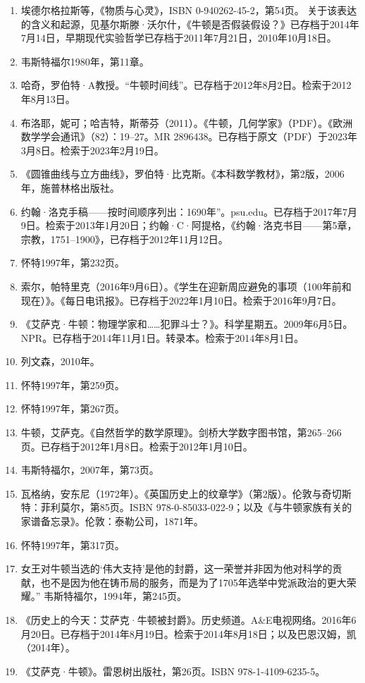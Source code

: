 \begin{enumerate}
\item 埃德尔格拉斯等，《物质与心灵》，ISBN 0-940262-45-2，第54页。  
关于该表达的含义和起源，见基尔斯滕·沃尔什，《牛顿是否假装假设？》已存档于2014年7月14日，早期现代实验哲学已存档于2011年7月21日，2010年10月18日。  
\item 韦斯特福尔1980年，第11章。
\item 哈奇，罗伯特·A教授。“牛顿时间线”。已存档于2012年8月2日。检索于2012年8月13日。  
\item 布洛耶，妮可；哈吉特，斯蒂芬（2011）。《牛顿，几何学家》（PDF）。《欧洲数学学会通讯》（82）：19–27。MR 2896438。已存档于原文（PDF）于2023年3月8日。检索于2023年2月19日。  
\item 《圆锥曲线与立方曲线》，罗伯特·比克斯。《本科数学教材》，第2版，2006年，施普林格出版社。  
\item 约翰·洛克手稿——按时间顺序列出：1690年”。psu.edu。已存档于2017年7月9日。检索于2013年1月20日；约翰·C·阿提格，《约翰·洛克书目——第5章，宗教，1751–1900》，已存档于2012年11月12日。  
\item 怀特1997年，第232页。
\item 索尔，帕特里克（2016年9月6日）。《学生在迎新周应避免的事项（100年前和现在）》。《每日电讯报》。已存档于2022年1月10日。检索于2016年9月7日。  
\item 《艾萨克·牛顿：物理学家和……犯罪斗士？》。科学星期五。2009年6月5日。NPR。已存档于2014年11月1日。转录本。检索于2014年8月1日。  
\item 列文森，2010年。  
\item 怀特1997年，第259页。  
\item 怀特1997年，第267页。
\item 牛顿，艾萨克。《自然哲学的数学原理》。剑桥大学数字图书馆，第265–266页。已存档于2012年1月8日。检索于2012年1月10日。  
\item 韦斯特福尔，2007年，第73页。  
\item 瓦格纳，安东尼（1972年）。《英国历史上的纹章学》（第2版）。伦敦与奇切斯特：菲利莫尔，第85页。ISBN 978-0-85033-022-9；以及《与牛顿家族有关的家谱备忘录》。伦敦：泰勒公司，1871年。  
\item 怀特1997年，第317页。  
\item 女王对牛顿当选的‘伟大支持’是他的封爵，这一荣誉并非因为他对科学的贡献，也不是因为他在铸币局的服务，而是为了1705年选举中党派政治的更大荣耀。” 韦斯特福尔，1994年，第245页。
\item 《历史上的今天：艾萨克·牛顿被封爵》。历史频道。A&E电视网络。2016年6月20日。已存档于2014年8月19日。检索于2014年8月18日；以及巴恩汉姆，凯（2014年）。\item 《艾萨克·牛顿》。雷恩树出版社，第26页。ISBN 978-1-4109-6235-5。  

\end{enumerate}
